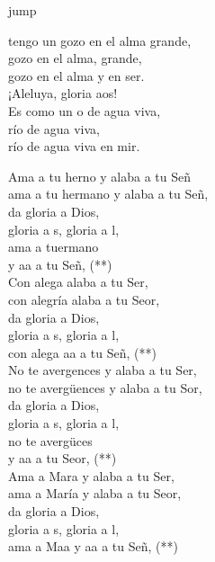 \begin{cancion}jump\\
	\begin{chorus}%
		 tengo un gozo en el alma grande,\\
	\jump
	gozo en el alma, grande,\\
		gozo en el alma y en ser.\\
		¡Aleluya, gloria aos!\\
		Es como un o de agua viva,\\
	\jump
	río de agua viva,\\
		río de agua viva en mir. \jump\\
	\end{chorus}%
	Ama a tu herno y alaba a tu Señ\\
	ama a tu hermano y alaba a tu Señ,\\
	\jump
da gloria a Dios,\\
	gloria a s, gloria a l,\\
	ama a tuermano \\
	y aa a tu Señ, (**)\\
	\jump
	Con alega alaba a tu Ser,\\
	con alegría alaba a tu Seor,\\
	\jump
da gloria a Dios,\\
	gloria a s, gloria a l,\\
	con alega aa a tu Señ, (**)\\
	\jump
	No te avergences y alaba a tu Ser,\\
	no te avergüences y alaba a tu Sor,\\
	\jump
da gloria a Dios,\\
	gloria a s, gloria a l,\\
	no te avergüces \\
	y aa a tu Seor, (**)\\
	\jump
	Ama a Mara y alaba a tu Ser,\\
	ama a María y alaba a tu Seor,\\
	\jump
da gloria a Dios,\\
	gloria a s, gloria a l,\\
	ama a Maa y aa a tu Señ, (**)\\
	\jump
\end{cancion}%
